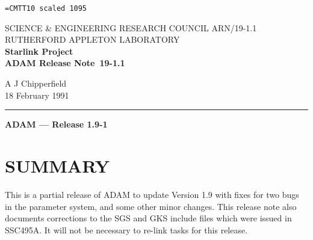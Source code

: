 \pagestyle{myheadings}

\newcommand{\stardoccategory}  {ADAM Release Note}
\newcommand{\stardocinitials}  {ARN}
\newcommand{\stardocnumber}    {19-1.1}
\newcommand{\stardocauthors}   {A J Chipperfield}
\newcommand{\stardocdate}      {18 February 1991}
\newcommand{\stardoctitle}     {ADAM --- Release 1.9-1}

\newcommand{\stardocname}{\stardocinitials /\stardocnumber}
\markright{\stardocname}
\setlength{\textwidth}{160mm}
\setlength{\textheight}{240mm}
\setlength{\topmargin}{-5mm}
\setlength{\oddsidemargin}{0mm}
\setlength{\evensidemargin}{0mm}
\setlength{\parindent}{0mm}
\setlength{\parskip}{\medskipamount}
\setlength{\unitlength}{1mm}


\font\tt=CMTT10 scaled 1095
\renewcommand{\_}{{\tt\char'137}}


\thispagestyle{empty}
SCIENCE \& ENGINEERING RESEARCH COUNCIL \hfill \stardocname\\
RUTHERFORD APPLETON LABORATORY\\
{\large\bf Starlink Project\\}
{\large\bf \stardoccategory\ \stardocnumber}
\begin{flushright}
\stardocauthors\\
\stardocdate
\end{flushright}
\vspace{-4mm}
\rule{\textwidth}{0.5mm}
\vspace{5mm}
\begin{center}
{\Large\bf \stardoctitle}
\end{center}
\vspace{5mm}

\section{SUMMARY}
This is a partial release of ADAM to update Version 1.9 with fixes for two 
bugs in the parameter system, and some other minor changes.
This release note also documents corrections to the SGS and GKS include files
which were issued in SSC495A.
It will not be necessary to re-link tasks for this release.

